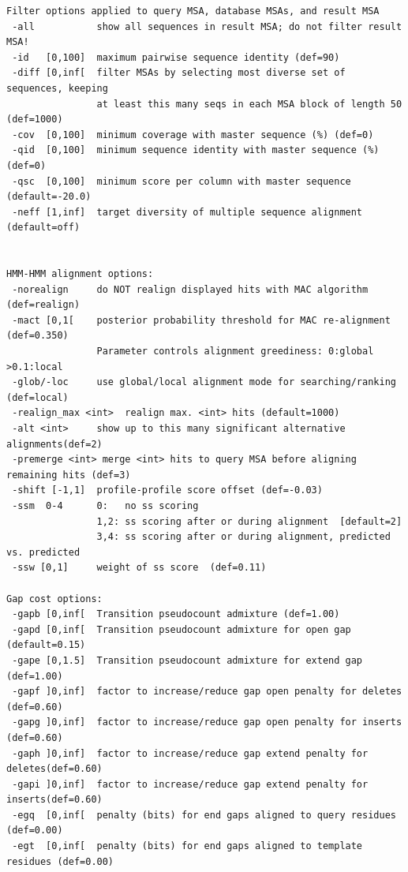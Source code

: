 \documentclass[11pt,a4paper]{article}
\begin{document}
\begin{verbatim}
Filter options applied to query MSA, database MSAs, and result MSA              
 -all           show all sequences in result MSA; do not filter result MSA!     
 -id   [0,100]  maximum pairwise sequence identity (def=90)
 -diff [0,inf[  filter MSAs by selecting most diverse set of sequences, keeping 
                at least this many seqs in each MSA block of length 50 (def=1000) 
 -cov  [0,100]  minimum coverage with master sequence (%) (def=0)             
 -qid  [0,100]  minimum sequence identity with master sequence (%) (def=0)    
 -qsc  [0,100]  minimum score per column with master sequence (default=-20.0)             
 -neff [1,inf]  target diversity of multiple sequence alignment (default=off)   


HMM-HMM alignment options:                                                       
 -norealign     do NOT realign displayed hits with MAC algorithm (def=realign)   
 -mact [0,1[    posterior probability threshold for MAC re-alignment (def=0.350)  
                Parameter controls alignment greediness: 0:global >0.1:local     
 -glob/-loc     use global/local alignment mode for searching/ranking (def=local)
 -realign_max <int>  realign max. <int> hits (default=1000)                        
 -alt <int>     show up to this many significant alternative alignments(def=2)  
 -premerge <int> merge <int> hits to query MSA before aligning remaining hits (def=3)
 -shift [-1,1]  profile-profile score offset (def=-0.03)                         
 -ssm  0-4      0:   no ss scoring                                               
                1,2: ss scoring after or during alignment  [default=2]         
                3,4: ss scoring after or during alignment, predicted vs. predicted
 -ssw [0,1]     weight of ss score  (def=0.11)                                  

Gap cost options:                                                                
 -gapb [0,inf[  Transition pseudocount admixture (def=1.00)                     
 -gapd [0,inf[  Transition pseudocount admixture for open gap (default=0.15)    
 -gape [0,1.5]  Transition pseudocount admixture for extend gap (def=1.00)      
 -gapf ]0,inf]  factor to increase/reduce gap open penalty for deletes (def=0.60) 
 -gapg ]0,inf]  factor to increase/reduce gap open penalty for inserts (def=0.60) 
 -gaph ]0,inf]  factor to increase/reduce gap extend penalty for deletes(def=0.60)
 -gapi ]0,inf]  factor to increase/reduce gap extend penalty for inserts(def=0.60)
 -egq  [0,inf[  penalty (bits) for end gaps aligned to query residues (def=0.00) 
 -egt  [0,inf[  penalty (bits) for end gaps aligned to template residues (def=0.00)


\end{verbatim}
\end{document}
